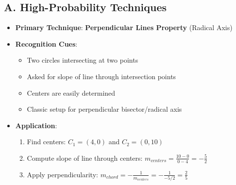 \documentclass[12pt]{article}
\begin{document}
\begin{techniquesbox}
\subsection*{A. High-Probability Techniques}
\begin{itemize}[leftmargin=*]
    \item \textbf{Primary Technique}: \textbf{Perpendicular Lines Property} (Radical Axis)
    \item \textbf{Recognition Cues}: 
    \begin{itemize}
        \item Two circles intersecting at two points
        \item Asked for slope of line through intersection points
        \item Centers are easily determined
        \item Classic setup for perpendicular bisector/radical axis
    \end{itemize}
    \item \textbf{Application}: 
    \begin{enumerate}
        \item Find centers: $C_1 = (4, 0)$ and $C_2 = (0, 10)$
        \item Compute slope of line through centers: $m_{centers} = \frac{10-0}{0-4} = -\frac{5}{2}$
        \item Apply perpendicularity: $m_{chord} = -\frac{1}{m_{centers}} = -\frac{1}{-5/2} = \frac{2}{5}$
    \end{enumerate}
\end{itemize}


\end{techniquesbox}
\end{document}
